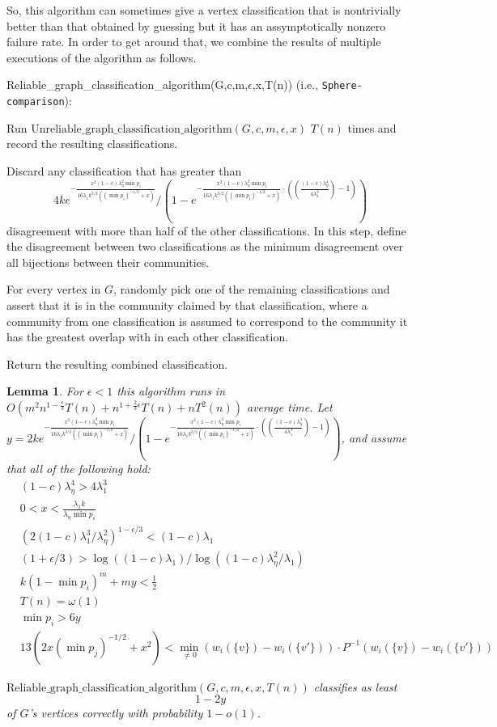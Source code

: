 \documentclass[11pt]{article}
\newcommand{\1}{\mathbb{1}}
\newtheorem{lemma}{Lemma}
\begin{document}
So, this algorithm can sometimes give a vertex classification that is nontrivially better than that obtained by guessing but it has an assymptotically nonzero failure rate. In order to get around that, we combine the results of multiple executions of the algorithm as follows.
\begin{algorithm}
Reliable\_graph\_classification\_algorithm(G,c,m,$\epsilon$,x,T(n)) (i.e., {\tt Sphere-comparison}):

\phantom{xxx} Run $\text{Unreliable\_graph\_classification\_algorithm}(G,c,m,\epsilon,x)$ $T(n)$ times and record the resulting classifications.

\phantom{xxx} Discard any classification that has greater than $$4ke^{-\frac{x^2(1-c)\lambda_{\eta}^2\min p_i}{16\lambda_1k^{3/2}((\min p_i)^{-1/2}+x)}}/\left(1-e^{-\frac{x^2(1-c)\lambda_{\eta}^2\min p_i}{16\lambda_1k^{3/2}((\min p_i)^{-1/2}+x)}\cdot((\frac{(1-c)\lambda_{\eta}^4}{4\lambda_1^3})-1)}\right)$$  disagreement with more than half of the other classifications. In this step, define the disagreement between two classifications as the minimum disagreement over all bijections between their communities.

\phantom{xxx} For every vertex in $G$, randomly pick one of the remaining classifications and assert that it is in the community claimed by that classification, where a community from one classification is assumed to correspond to the community it has the greatest overlap with in each other classification.

\phantom{xxx} Return the resulting combined classification.
\end{algorithm}

\begin{lemma}
For $\epsilon<1$ this algorithm runs in $O(m^2 n^{1-\frac{\epsilon}{3}}T(n)+n^{1+\frac{2}{3}\epsilon}T(n)+nT^2(n))$ average time. Let $y=2ke^{-\frac{x^2(1-c)\lambda_{\eta}^2\min p_i}{16\lambda_1k^{3/2}((\min p_i)^{-1/2}+x)}}/\left(1-e^{-\frac{x^2(1-c)\lambda_{\eta}^2\min p_i}{16\lambda_1k^{3/2}((\min p_i)^{-1/2}+x)}\cdot((\frac{(1-c)\lambda_{\eta}^4}{4\lambda_1^3})-1)}\right)$, and assume that all of the following hold:
\begin{align*}
&(1-c)\lambda_{\eta}^4>4\lambda_1^3\\
&0<x<\frac{\lambda_1k}{\lambda_{\eta}\min p_i}\\
&(2(1-c)\lambda_1^3/\lambda_{\eta}^2)^{1-\epsilon/3}<(1-c)\lambda_1\\
&(1+\epsilon/3)>\log((1-c)\lambda_1)/\log ((1-c)\lambda_{\eta}^2/\lambda_1)\\
&k(1-\min p_i)^m+my<\frac{1}{2}\\
&T(n)=\omega(1)\\
&\min p_i>6y\\
&13(2x(\min p_j)^{-1/2}+x^2)<\min_{\ne0} (w_i(\{v\})- w_i(\{v'\}))\cdot P^{-1}(w_i(\{v\})- w_i(\{v'\}))
\end{align*}

$\text{Reliable\_graph\_classification\_algorithm}(G,c,m,\epsilon,x,T(n))$ classifies as least $$1-2y$$ of $G$'s vertices correctly with probability $1-o(1)$.
\end{lemma}
\end{document}
